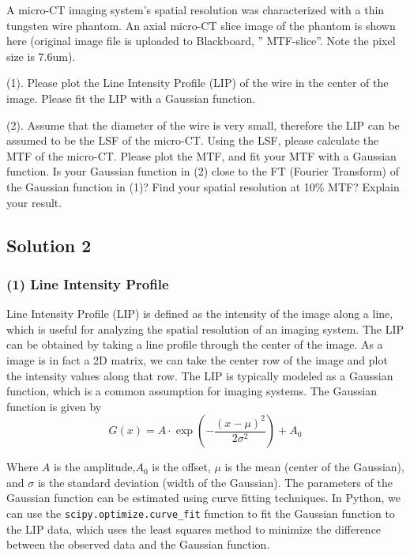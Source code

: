 \documentclass[12pt, a4paper, oneside]{ctexart}
\begin{document}
\begin{problem}

A micro-CT imaging system’s spatial resolution was characterized with a thin tungsten wire phantom. An axial micro-CT slice image of the phantom is shown here (original image file is uploaded to Blackboard, ” MTF-slice”. Note the pixel size is 7.6um).

(1). Please plot the Line Intensity Profile (LIP) of the wire in the center of the image. Please fit the LIP with a Gaussian function.

(2). Assume that the diameter of the wire is very small, therefore the LIP can be assumed to be the LSF of the micro-CT. Using the LSF, please calculate the MTF of the micro-CT.  Please plot the MTF, and fit your MTF with a Gaussian function.  Is your Gaussian function in (2) close to the FT (Fourier Transform) of the Gaussian function in (1)? Find your spatial resolution at 10\% MTF? Explain your result.


\end{problem}
\subsection*{Solution 2}

\subsubsection*{(1) Line Intensity Profile}

Line Intensity Profile (LIP) is defined as the intensity of the image along a line, which is useful for analyzing the spatial resolution of an imaging system. The LIP can be obtained by taking a line profile through the center of the image. As a image is in fact a 2D matrix, we can take the center row of the image and plot the intensity values along that row. The LIP is typically modeled as a Gaussian function, which is a common assumption for imaging systems. The Gaussian function is given by
\[G(x) = A \cdot \exp(-\frac{(x - \mu)^2}{2\sigma^2})+A_0\]


Where \(A\) is the amplitude,\(A_0\) is the offset, \(\mu\) is the mean (center of the Gaussian), and \(\sigma\) is the standard deviation (width of the Gaussian). The parameters of the Gaussian function can be estimated using curve fitting techniques. In Python, we can use the \texttt{scipy.optimize.curve\_fit} function to fit the Gaussian function to the LIP data, which uses the least squares method to minimize the difference between the observed data and the Gaussian function.
\end{document}
